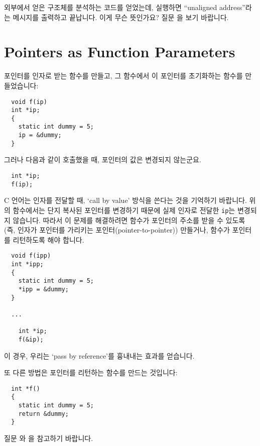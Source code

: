 \begin{faq}
        외부에서 얻은 구조체를 분석하는 코드를 얻었는데, 실행하면 ``unaligned address''라는
        메시지를 출력하고 끝납니다. 이게 무슨 뜻인가요?
\A
        질문 을 보기 바랍니다.
\end{faq}

\section{Pointers as Function Parameters}

\begin{faq}
	포인터를 인자로 받는 함수를 만들고, 그 함수에서 이 포인터를
	초기화하는 함수를 만들었습니다:

\begin{verbatim}
  void f(ip)
  int *ip;
  {
    static int dummy = 5;
    ip = &dummy;
  }
\end{verbatim}

	\noindent 그러나 다음과 같이 호출했을 때, 포인터의 값은 변경되지
	않는군요.

\begin{verbatim}
  int *ip;
  f(ip);
\end{verbatim}

\A
	C 언어는 인자를 전달할 때, `call by value' 방식을 쓴다는 것을
	기억하기 바랍니다.  위의 함수에서는 단지 복사된 포인터를 변경하기 때문에
	실제 인자로 전달한 \verb+ip+는 변경되지 않습니다.  따라서
	이 문제를 해결하려면 함수가 포인터의 주소를 받을 수 있도록
	(즉, 인자가 포인터를 가리키는 포인터(pointer-to-pointer)) 만들거나,
	함수가 포인터를 리턴하도록 해야 합니다.

\begin{verbatim}
  void f(ipp)
  int *ipp;
  {
    static int dummy = 5;
    *ipp = &dummy;
  }

  ...

    int *ip;
    f(&ip);
\end{verbatim}
        \noindent 이 경우, 우리는 `pass by reference'를 흉내내는 효과를 얻습니다.

        또 다른 방법은 포인터를 리턴하는 함수를 만드는 것입니다:
\begin{verbatim}
  int *f()
  {
    static int dummy = 5;
    return &dummy;
  }
\end{verbatim}
	질문 와 을 참고하기 바랍니다.
\end{faq}

